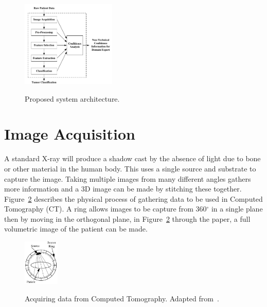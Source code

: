 \documentclass[journal]{IEEEtran}
\begin{document}
\begin{figure}[!htb]
   \centering
   \includegraphics[width = 0.4\textwidth]{Figures/Proposed.pdf}
   \label{fig:Proposed}
   \caption{Proposed system architecture.}
\end{figure}



\section{Image Acquisition}
\label{sec:ImageAcquisition}

A standard X-ray will produce a shadow cast by the absence of light due to bone or other material in the human body.
This uses a single source and substrate to capture the image.
Taking multiple images from many different angles gathers more information and a 3D image can be made by stitching these together.
Figure~\ref{fig:ct} describes the physical process of gathering data to be used in Computed Tomography (CT).
A ring allows images to be capture from 360$^{\circ}$ in a single plane then by moving in the orthogonal plane, in Figure~\ref{fig:ct} through the paper, a full volumetric image of the patient can be made. 

\begin{figure}[!htb]
   \centering
   \includegraphics[width = 0.15\textwidth]{Figures/CT.pdf}
   \label{fig:ct}
   \caption{Acquiring data from Computed Tomography. Adapted from~\cite{kayvan2006biomedical}.}
\end{figure}
\end{document}
